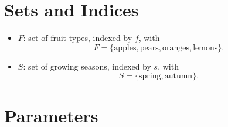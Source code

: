 \section*{Sets and Indices}

\begin{itemize}
    \item $F$: set of fruit types, indexed by $f$, with
    \[
    F=\{\text{apples},\text{pears},\text{oranges},\text{lemons}\}.
    \]
    \item $S$: set of growing seasons, indexed by $s$, with
    \[
    S=\{\text{spring},\text{autumn}\}.
    \]
\end{itemize}

\section*{Parameters}

